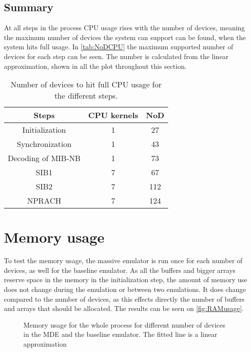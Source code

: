 \subsection{Summary}
At all steps in the process CPU usage rises with the number of devices, meaning the maximum number of devices the system can support can be found, when the system hits full usage. In \autoref{tab:NoDCPU} the maximum supported number of devices for each step can be seen. The number is calculated from the linear approximation, shown in all the plot throughout this section.

\begin{table}[H]
\centering
\begin{tabular}{|c|c|c|}
\hline
Steps & CPU kernels & NoD \\
\hline
Initialization & 1 & 27 \\
\hline
Synchronization & 1 & 43 \\
\hline
Decoding of MIB-NB & 1 & 73 \\
\hline
SIB1 & 7 & 67 \\
\hline
SIB2 & 7 & 112 \\
\hline
NPRACH & 7 & 124 \\
\hline
\end{tabular}
\caption{Number of devices to hit full CPU usage for the different steps.}
\label{tab:NoDCPU}
\end{table}

\section{Memory usage}
To test the memory usage, the massive emulator is run once for each number of devices, as well for the baseline emulator. As all the buffers and bigger arrays reserve space in the memory in the initialization step, the amount of memory use does not change during the emulation or between two emulations. It does change compared to the number of devices, as this effects directly the number of buffers and arrays that should be allocated. The results can be seen on \autoref{fig:RAMusage}.

\begin{figure}[H]
\centering
\resizebox{0.5\textwidth}{!}{
}
\caption{Memory usage for the whole process for different number of devices in the MDE and the baseline emulator. The fitted line is a linear approximation}
\label{fig:RAMusage}
\end{figure}

